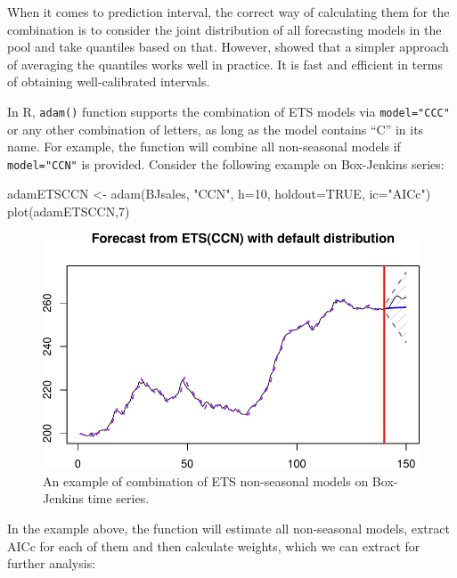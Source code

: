 \documentclass[
]{book}
\newenvironment{Shaded}{\begin{snugshade}}{\end{snugshade}}
\newcommand{\AttributeTok}[1]{\textcolor[rgb]{0.77,0.63,0.00}{#1}}
\newcommand{\ConstantTok}[1]{\textcolor[rgb]{0.00,0.00,0.00}{#1}}
\newcommand{\DecValTok}[1]{\textcolor[rgb]{0.00,0.00,0.81}{#1}}
\newcommand{\FunctionTok}[1]{\textcolor[rgb]{0.00,0.00,0.00}{#1}}
\newcommand{\NormalTok}[1]{#1}
\newcommand{\OtherTok}[1]{\textcolor[rgb]{0.56,0.35,0.01}{#1}}
\newcommand{\StringTok}[1]{\textcolor[rgb]{0.31,0.60,0.02}{#1}}
\theoremstyle{definition}
\theoremstyle{definition}
\theoremstyle{definition}
\theoremstyle{definition}
\theoremstyle{remark}
\begin{document}
When it comes to prediction interval, the correct way of calculating them for the combination is to consider the joint distribution of all forecasting models in the pool and take quantiles based on that. However, \citet{Lichtendahl2013} showed that a simpler approach of averaging the quantiles works well in practice. It is fast and efficient in terms of obtaining well-calibrated intervals.

In R, \texttt{adam()} function supports the combination of ETS models via \texttt{model="CCC"} or any other combination of letters, as long as the model contains ``C'' in its name. For example, the function will combine all non-seasonal models if \texttt{model="CCN"} is provided. Consider the following example on Box-Jenkins series:

\begin{Shaded}
\begin{Highlighting}[]
\NormalTok{adamETSCCN }\OtherTok{\textless{}{-}} \FunctionTok{adam}\NormalTok{(BJsales, }\StringTok{"CCN"}\NormalTok{, }\AttributeTok{h=}\DecValTok{10}\NormalTok{, }\AttributeTok{holdout=}\ConstantTok{TRUE}\NormalTok{, }\AttributeTok{ic=}\StringTok{"AICc"}\NormalTok{)}
\FunctionTok{plot}\NormalTok{(adamETSCCN,}\DecValTok{7}\NormalTok{)}
\end{Highlighting}
\end{Shaded}

\begin{figure}
\centering
\includegraphics{adam_files/figure-latex/adamETSCCN-1.pdf}
\caption{\label{fig:adamETSCCN}An example of combination of ETS non-seasonal models on Box-Jenkins time series.}
\end{figure}

In the example above, the function will estimate all non-seasonal models, extract AICc for each of them and then calculate weights, which we can extract for further analysis:
\end{document}
